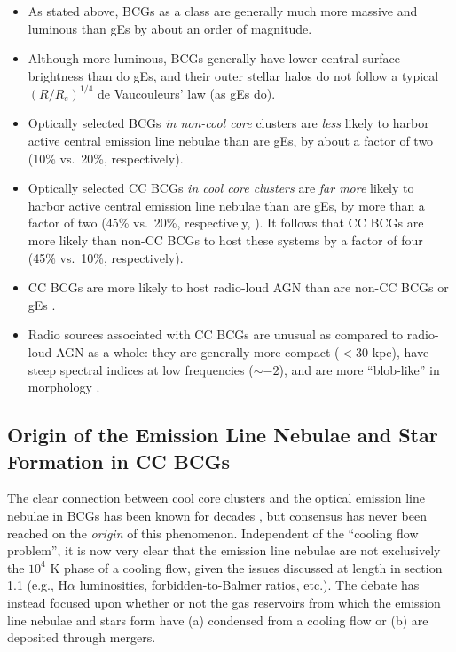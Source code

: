 \begin{itemize}


\item As stated above, BCGs as a class are generally much more massive and luminous than gEs by about an order of magnitude. 


\item Although more luminous, BCGs generally have lower central surface brightness than do gEs, 
and their outer stellar halos do not follow a typical  $\left(R/R_e\right)^{1/4}$ de Vaucouleurs' law (as gEs do). 

\item Optically selected BCGs {\it in non-cool core} clusters are {\it less} likely to harbor active central emission line nebulae than are gEs, by about a factor of two (10\% vs.~20\%, respectively).

\item Optically selected CC BCGs {\it in cool core clusters} are {\it far more} likely to harbor  active central emission line nebulae than are gEs, by more than a factor of two (45\% vs.~20\%, respectively, \citealt{best06,edwards07}). It follows that CC BCGs are more likely than non-CC BCGs to host these systems by a factor of four (45\% vs.~10\%, respectively). 

\item CC BCGs are more likely to host radio-loud AGN than are non-CC BCGs or gEs \citep{burns90}. 

\item Radio sources associated with CC BCGs are unusual as compared to radio-loud AGN as a whole: 
they are generally more compact ($<30$ kpc), have steep spectral indices at low 
frequencies ($\sim -2$), and are more ``blob-like'' in morphology \citep{odeabaum87,baum87}. 

\end{itemize}








\subsection{Origin of the Emission Line Nebulae and Star Formation in CC BCGs}
\label{section:bcgsincoolcores}

The clear connection between cool core clusters and the optical emission line nebulae in BCGs has been known for decades \citep{hu85,baum87,heckman89}, 
but consensus has never been reached on the {\it origin} of this phenomenon. 
Independent of the ``cooling flow problem'', it is now very clear that the emission line nebulae are not exclusively the $10^4$ K phase of a cooling flow, 
given the issues discussed at length in section 1.1 (e.g., H$\alpha$ luminosities, forbidden-to-Balmer ratios, etc.). The debate has instead focused 
upon whether or not the gas reservoirs from which the emission line nebulae and stars form have (a) condensed from a cooling flow or (b) are deposited through 
mergers.

